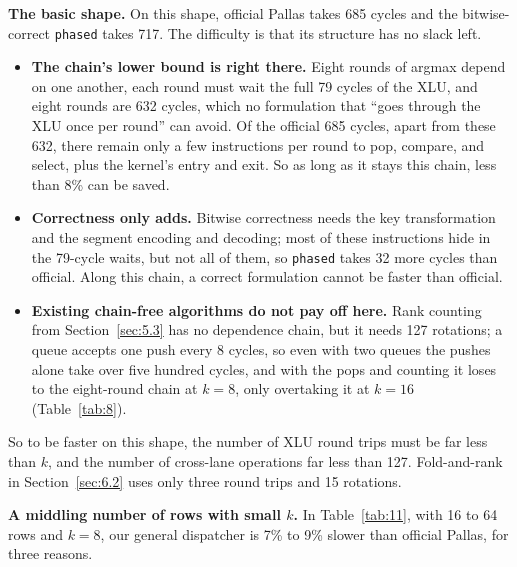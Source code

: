 \documentclass[sigconf,nonacm,balance=false]{acmart}
\newcommand{\code}[1]{\texttt{#1}}
\begin{document}
\textbf{The basic shape.} On this shape, official Pallas takes 685 cycles and the bitwise-correct \code{phased} takes 717. The difficulty is that its structure has no slack left.

\begin{itemize}
\item \textbf{The chain's lower bound is right there.} Eight rounds of argmax depend on one another, each round must wait the full 79 cycles of the XLU, and eight rounds are 632 cycles, which no formulation that ``goes through the XLU once per round'' can avoid. Of the official 685 cycles, apart from these 632, there remain only a few instructions per round to pop, compare, and select, plus the kernel's entry and exit. So as long as it stays this chain, less than 8\% can be saved.
\item \textbf{Correctness only adds.} Bitwise correctness needs the key transformation and the segment encoding and decoding; most of these instructions hide in the 79-cycle waits, but not all of them, so \code{phased} takes 32 more cycles than official. Along this chain, a correct formulation cannot be faster than official.
\item \textbf{Existing chain-free algorithms do not pay off here.} Rank counting from Section~\ref{sec:5.3} has no dependence chain, but it needs 127 rotations; a queue accepts one push every 8 cycles, so even with two queues the pushes alone take over five hundred cycles, and with the pops and counting it loses to the eight-round chain at $k = 8$, only overtaking it at $k = 16$ (Table~\ref{tab:8}).
\end{itemize}

So to be faster on this shape, the number of XLU round trips must be far less than $k$, and the number of cross-lane operations far less than 127. Fold-and-rank in Section~\ref{sec:6.2} uses only three round trips and 15 rotations.

\textbf{A middling number of rows with small $k$.} In Table~\ref{tab:11}, with 16 to 64 rows and $k = 8$, our general dispatcher is 7\% to 9\% slower than official Pallas, for three reasons.
\end{document}

